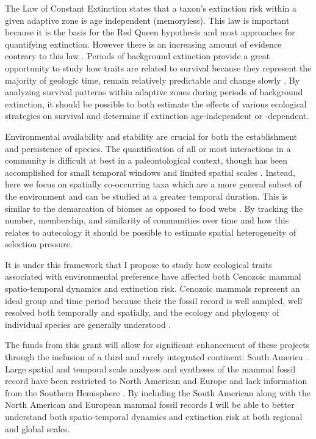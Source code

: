 \documentclass[11pt,letterpaper]{article}
\begin{document}
The Law of Constant Extinction \citep{VanValen1973} states that a taxon's extinction risk within a given adaptive zone is age independent (memoryless). This law is important because it is the basis for the Red Queen hypothesis and most approaches for quantifying extinction. However there is an increasing amount of evidence contrary to this law \citep{Drake2014,Raup1975,Sepkoski1975,Finnegan2008}. Periods of background extinction provide a great opportunity to study how traits are related to survival because they represent the majority of geologic time, remain relatively predictable and change slowly \citep{Jablonski1986,Raup1988}. By analyzing survival patterns within adaptive zones during periods of background extinction, it should be possible to both estimate the effects of various ecological strategies on survival and determine if extinction age-independent or -dependent.

Environmental availability and stability are crucial for both the establishment and persistence of species. The quantification of all or most interactions in a community is difficult at best in a paleontological context, though has been accomplished for small temporal windows and limited spatial scales \citep{Angielczyk2005,Mitchell2012,Roopnarine2007}. Instead, here we focus on spatially co-occurring taxa which are a more general subset of the environment and can be studied at a greater temporal duration. This is similar to the demarcation of biomes as opposed to food webs \citep{Vilhena2013b}. By tracking the number, membership, and similarity of communities over time and how this relates to autecology it should be possible to estimate spatial heterogeneity of selection pressure.

It is under this framework that I propose to study how ecological traits associated with environmental preference have affected both Cenozoic mammal spatio-temporal dynamics and extinction risk. Cenozoic mammals represent an ideal group and time period because their the fossil record is well sampled, well resolved both temporally and spatially, and the ecology and phylogeny of individual species are generally understood \citep{Alroy2009,Alroy2000g,Jernvall2002,Liow2008,Smith2004}. 

The funds from this grant will allow for significant enhancement of these projects through the inclusion of a third and rarely integrated continent: South America \citep{Stromberg2013,Marshall1982}. Large spatial and temporal scale analyses and syntheses of the mammal fossil record have been restricted to North American and Europe and lack information from the Southern Hemisphere \citep{Jernvall2004,Jernvall2002,Fortelius2002,Janis2000,Alroy1996a,Alroy1998,Alroy2000g,Liow2008,Raia2006,Tomiya2013}. By including the South American along with the North American and European mammal fossil records I will be able to better understand both spatio-temporal dynamics and extinction risk at both regional and global scales. 
\end{document}
